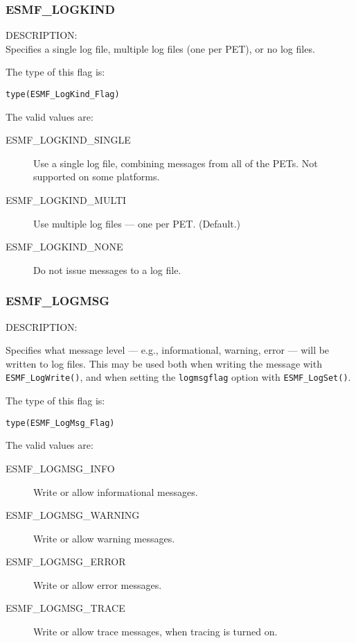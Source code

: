 

\subsubsection{ESMF\_LOGKIND}
\label{opt:logkindflag}

{\sf DESCRIPTION:\\}
Specifies a single log file, multiple log files (one per PET), or no log files.

The type of this flag is:

{\tt type(ESMF\_LogKind\_Flag)}

The valid values are:
\begin{description}
   \item [ESMF\_LOGKIND\_SINGLE] 
         Use a single log file, combining messages from all of the PETs.  Not supported on some platforms.
   \item [ESMF\_LOGKIND\_MULTI]
         Use multiple log files --- one per PET.  (Default.)
   \item [ESMF\_LOGKIND\_NONE]
         Do not issue messages to a log file.
\end{description}

\subsubsection{ESMF\_LOGMSG}
\label{opt:logmsgflag}

{\sf DESCRIPTION:\\}
\begin{sloppypar}
Specifies what message level --- e.g., informational, warning, 
error --- will be written to log files.  This may be used both when
writing the message with {\tt ESMF\_LogWrite()}, and when setting the
{\tt logmsgflag} option with {\tt ESMF\_LogSet()}.
\end{sloppypar}

The type of this flag is:

{\tt type(ESMF\_LogMsg\_Flag)}

The valid values are:
\begin{description}
   \item [ESMF\_LOGMSG\_INFO] 
         Write or allow informational messages.
   \item [ESMF\_LOGMSG\_WARNING]
         Write or allow warning messages.
   \item [ESMF\_LOGMSG\_ERROR]
         Write or allow error messages.
   \item [ESMF\_LOGMSG\_TRACE]
         Write or allow trace messages, when tracing is turned on.
\end{description}




